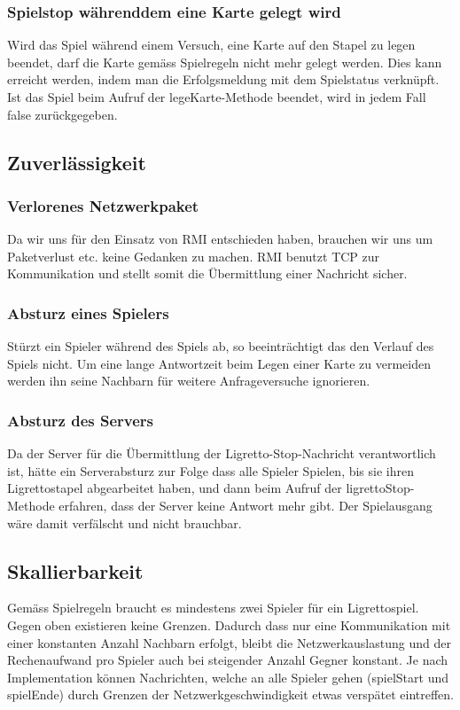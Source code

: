 \subsubsection{Spielstop währenddem eine Karte gelegt wird}
Wird das Spiel während einem Versuch, eine Karte auf den Stapel zu legen beendet, darf die Karte gemäss Spielregeln nicht mehr gelegt werden. Dies kann erreicht werden, indem man die Erfolgsmeldung mit dem Spielstatus verknüpft. Ist das Spiel beim Aufruf der legeKarte-Methode beendet, wird in jedem Fall false zurückgegeben.

\subsection{Zuverlässigkeit}

\subsubsection{Verlorenes Netzwerkpaket}
Da wir uns für den Einsatz von RMI entschieden haben, brauchen wir uns um Paketverlust etc. keine Gedanken zu machen. RMI benutzt TCP zur Kommunikation und stellt somit die Übermittlung einer Nachricht sicher.

\subsubsection{Absturz eines Spielers}
Stürzt ein Spieler während des Spiels ab, so beeinträchtigt das den Verlauf des Spiels nicht. Um eine lange Antwortzeit beim Legen einer Karte zu vermeiden werden ihn seine Nachbarn für weitere Anfrageversuche ignorieren.

\subsubsection{Absturz des Servers}
Da der Server für die Übermittlung der Ligretto-Stop-Nachricht verantwortlich ist, hätte ein Serverabsturz zur Folge dass alle Spieler Spielen, bis sie ihren Ligrettostapel abgearbeitet haben, und dann beim Aufruf der ligrettoStop-Methode erfahren, dass der Server keine Antwort mehr gibt. Der Spielausgang wäre damit verfälscht und nicht brauchbar.

\subsection{Skallierbarkeit}

Gemäss Spielregeln braucht es mindestens zwei Spieler für ein Ligrettospiel. Gegen oben existieren keine Grenzen. Dadurch dass nur eine Kommunikation mit einer konstanten Anzahl Nachbarn erfolgt, bleibt die Netzwerkauslastung und der Rechenaufwand pro Spieler auch bei steigender Anzahl Gegner konstant. Je nach Implementation können Nachrichten, welche an alle Spieler gehen (spielStart und spielEnde) durch Grenzen der Netzwerkgeschwindigkeit etwas verspätet eintreffen.

